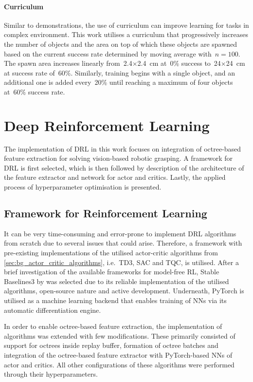 \paragraph{Curriculum} Similar to demonstrations, the use of curriculum can improve learning for tasks in complex environment. This work utilises a curriculum that progressively increases the number of objects and the area on top of which these objects are spawned based on the current success rate determined by moving average with~\(n = 100\). The spawn area increases linearly from~2.4\({\times}\)2.4~cm at~0\% success to~24\({\times}\)24~cm at success rate of~60\%. Similarly, training begins with a single object, and an additional one is added every~20\% until reaching a maximum of four objects at~60\% success rate.


\section{Deep Reinforcement Learning}

The implementation of DRL in this work focuses on integration of octree-based feature extraction for solving vision-based robotic grasping. A framework for DRL is first selected, which is then followed by description of the architecture of the feature extractor and network for actor and critics. Lastly, the applied process of hyperparameter optimisation is presented.


\subsection{Framework for Reinforcement Learning}

It can be very time-consuming and error-prone to implement DRL algorithms from scratch due to several issues that could arise. Therefore, a framework with pre-existing implementations of the utilised actor-critic algorithms from \autoref{sec:bg_actor_critic_algorithms}, i.e.~TD3, SAC and TQC, is utilised. After a brief investigation of the available frameworks for model-free RL, Stable Baselines3 by \citet{raffin_stable-baselines3_2019} was selected due to its reliable implementation of the utilised algorithms, open-source nature and active development. Underneath, PyTorch \cite{paszke_pytorch_2019} is utilised as a machine learning backend that enables training of NNs via its automatic differentiation engine.

In order to enable octree-based feature extraction, the implementation of algorithms was extended with few modifications. These primarily consisted of support for octrees inside replay buffer, formation of octree batches and integration of the octree-based feature extractor with PyTorch-based NNs of actor and critics. All other configurations of these algorithms were performed through their hyperparameters.


